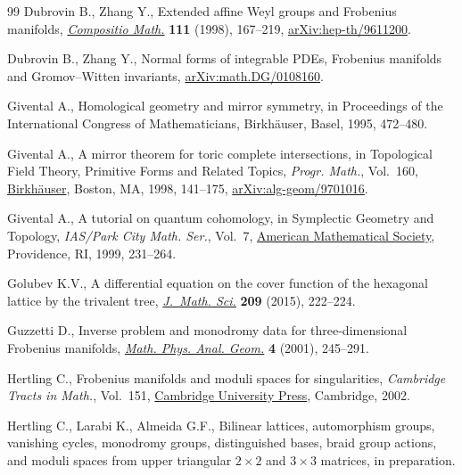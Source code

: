 \documentclass[pdftex]{sigma}
\numberwithin{equation}{section}
\begin{document}
\begin{thebibliography}{99}
Dubrovin B., Zhang Y., Extended affine {W}eyl groups and {F}robenius manifolds,
 \href{https://doi.org/10.1023/A:1000258122329}{\textit{Compositio Math.}}
 \textbf{111} (1998), 167--219,
 \href{http://arxiv.org/abs/hep-th/9611200}{arXiv:hep-th/9611200}.

Dubrovin B., Zhang Y., Normal forms of integrable {PDE}s, {F}robenius manifolds
 and {G}romov--{W}itten invariants,
 \href{http://arxiv.org/abs/math.DG/0108160}{arXiv:math.DG/0108160}.

Givental A., Homological geometry and mirror symmetry, in Proceedings of the
 {I}nternational {C}ongress of {M}athematicians, Birkh\"auser, Basel, 1995,
 472--480.

Givental A., A mirror theorem for toric complete intersections, in Topological
 {F}ield {T}heory, {P}rimitive {F}orms and {R}elated {T}opics, \textit{Progr.
 Math.}, Vol.~160,
 \href{https://doi.org/10.1007/978-1-4612-0705-4_5}{Birkh\"auser}, Boston, MA,
 1998, 141--175,
 \href{http://arxiv.org/abs/alg-geom/9701016}{arXiv:alg-geom/9701016}.

Givental A., A tutorial on quantum cohomology, in Symplectic {G}eometry and
 {T}opology, \textit{IAS/Park City Math. Ser.}, Vol.~7,
 \href{https://doi.org/10.1090/pcms/007/06}{American Mathematical Society},
 Providence, RI, 1999, 231--264.

Golubev K.V., A differential equation on the cover function of the hexagonal
 lattice by the trivalent tree,
 \href{https://doi.org/10.1007/s10958-015-2497-z}{\textit{J.~Math. Sci.}}
 \textbf{209} (2015), 222--224.

Guzzetti D., Inverse problem and monodromy data for three-dimensional
 {F}robenius manifolds,
 \href{https://doi.org/10.1023/A:1012933622521}{\textit{Math. Phys. Anal.
 Geom.}} \textbf{4} (2001), 245--291.

Hertling C., Frobenius manifolds and moduli spaces for singularities,
 \textit{Cambridge Tracts in Math.}, Vol.~151,
 \href{https://doi.org/10.1017/CBO9780511543104}{Cambridge University Press},
 Cambridge, 2002.

Hertling C., Larabi K., Almeida G.F., Bilinear lattices, automorphism groups,
 vanishing cycles, monodromy groups, distinguished bases, braid group actions,
 and moduli spaces from upper triangular $2 \times 2$ and $3 \times 3$
 matrices, {i}n preparation.


\end{thebibliography}
\end{document}
